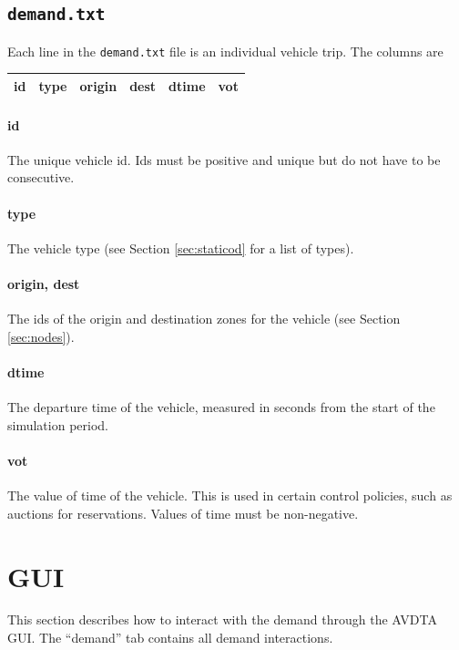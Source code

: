 \subsection{\texttt{demand.txt}}
Each line in the \texttt{demand.txt} file is an individual vehicle trip. The columns are
\begin{center}
\begin{tabular}{cccccc}
\hline
id & type & origin & dest & dtime & vot \\\hline
\end{tabular}
\end{center}
\paragraph*{id} The unique vehicle id. Ids must be positive and unique but do not have to be consecutive.
\paragraph*{type} The vehicle type (see Section \ref{sec:staticod} for a list of types).
\paragraph*{origin, dest} The ids of the origin and destination zones for the vehicle (see Section \ref{sec:nodes}).
\paragraph*{dtime} The departure time of the vehicle, measured in seconds from the start of the simulation period.
\paragraph*{vot} The value of time of the vehicle. This is used in certain control policies, such as auctions for reservations. Values of time must be non-negative.


\section{GUI}
This section describes how to interact with the demand through the AVDTA GUI. The ``demand'' tab contains all demand interactions. 

